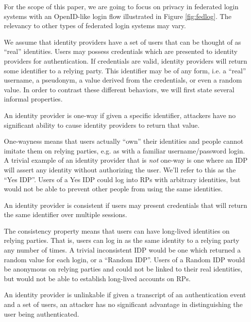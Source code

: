 \documentclass{llncs}
\begin{document}
For the scope of this paper, we are going to focus on privacy in
federated login systems with an OpenID-like login flow illustrated in
Figure \ref{fig:fedlog}. The relevancy to other types of federated
login systems may vary. 

We assume that identity providers have a set of users that can be
thought of as ``real'' identities. Users may possess credentials which
are presented to identity providers for authentication. If credentials
are valid, identity providers will return some identifier to a relying
party. This identifier may be of any form, i.e. a ``real'' username, a
pseudonym, a value derived from the credentials, or even a random
value. In order to contrast these different behaviors, we will first
state several informal properties.

\begin{definition}
\label{def:ownership}
An identity provider is one-way if given a specific identifier,
attackers have no significant ability to cause identity providers to
return that value.
\end{definition}

One-wayness means that users actually ``own'' their identities and
people cannot imitate them on relying parties, e.g. as with a familiar
username/password login. A trivial example of an identity provider
that is \textit{not} one-way is one where an IDP will assert any
identity without authorizing the user.  We'll refer to this as the
``Yes IDP''. Users of a Yes IDP could log into RPs with arbitrary
identities, but would not be able to prevent other people from using
the same identities.

\begin{definition}[Consistency]
\label{def:consistency}
An identity provider is consistent if users may present credentials
that will return the same identifier over multiple sessions.
\end{definition}

The consistency property means that users can have long-lived
identities on relying parties. That is, users can log in as the same
identity to a relying party any number of times. A trivial
inconsistent IDP would be one which returned a random value for each
login, or a ``Random IDP''. Users of a Random IDP would be anonymous
on relying parties and could not be linked to their real identities,
but would not be able to establish long-lived accounts on RPs.

\begin{definition}[Unlinkability]
\label{def:unlinkability}
An identity provider is unlinkable if given a transcript of an
authentication event and a set of users, an attacker has no
significant advantage in distinguishing the user being authenticated.
\end{definition}
\end{document}
